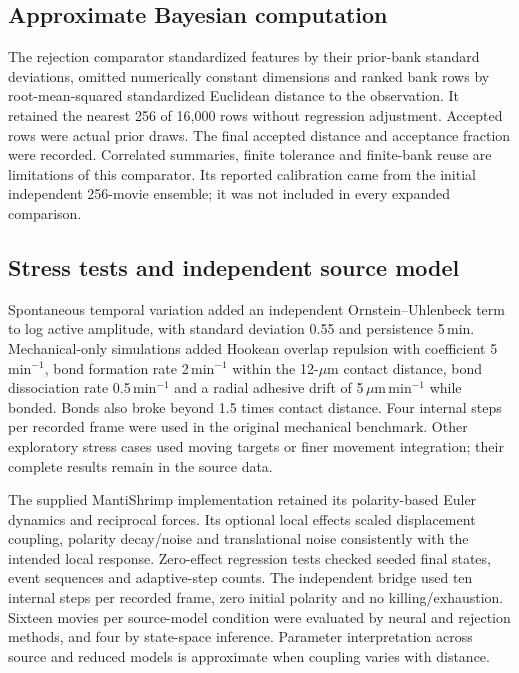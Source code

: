 \documentclass[12pt]{article}
\begin{document}
\subsection*{Approximate Bayesian computation}
The rejection comparator standardized features by their prior-bank standard deviations, omitted numerically constant dimensions and ranked bank rows by root-mean-squared standardized Euclidean distance to the observation. It retained the nearest 256 of 16,000 rows without regression adjustment. Accepted rows were actual prior draws. The final accepted distance and acceptance fraction were recorded. Correlated summaries, finite tolerance and finite-bank reuse are limitations of this comparator. Its reported calibration came from the initial independent 256-movie ensemble; it was not included in every expanded comparison.

\subsection*{Stress tests and independent source model}
Spontaneous temporal variation added an independent Ornstein--Uhlenbeck term to log active amplitude, with standard deviation 0.55 and persistence 5\,min. Mechanical-only simulations added Hookean overlap repulsion with coefficient 5\,min$^{-1}$, bond formation rate 2\,min$^{-1}$ within the 12-$\mu$m contact distance, bond dissociation rate 0.5\,min$^{-1}$ and a radial adhesive drift of 5\,$\mu$m\,min$^{-1}$ while bonded. Bonds also broke beyond 1.5 times contact distance. Four internal steps per recorded frame were used in the original mechanical benchmark. Other exploratory stress cases used moving targets or finer movement integration; their complete results remain in the source data.

The supplied MantiShrimp implementation retained its polarity-based Euler dynamics and reciprocal forces. Its optional local effects scaled displacement coupling, polarity decay/noise and translational noise consistently with the intended local response. Zero-effect regression tests checked seeded final states, event sequences and adaptive-step counts. The independent bridge used ten internal steps per recorded frame, zero initial polarity and no killing/exhaustion. Sixteen movies per source-model condition were evaluated by neural and rejection methods, and four by state-space inference. Parameter interpretation across source and reduced models is approximate when coupling varies with distance.
\end{document}
